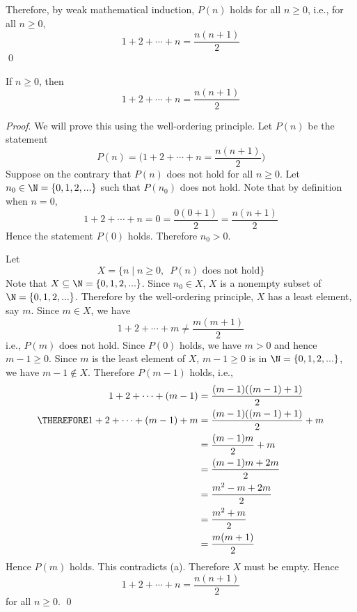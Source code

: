 Therefore, by weak mathematical induction,
$P(n)$ holds for all $n \geq 0$, i.e.,
for all $n \geq 0$,
\[
  1 + 2 + \cdots + n = \frac{n(n + 1)}{2}
\]
\qed




\newpage
\begin{thm}
  If $n \geq 0$, then
  \[
    1 + 2 + \cdots + n = \frac{n(n + 1)}{2}
  \]
\end{thm}

\textit{Proof}.
We will prove this using the well-ordering principle.
Let $P(n)$ be the statement
\[
    P(n) = \biggl( 1 + 2 + \cdots + n = \frac{n(n + 1)}{2} \biggr)
\]
Suppose on the contrary that $P(n)$ does not hold for all $n \geq 0$.
Let $n_0 \in \N = \{0, 1, 2, ...\}$ such that $P(n_0)$ does not hold.
Note that by definition when $n = 0$,
\[
1 + 2 + \cdots + n = 0 = \frac{0(0 + 1)}{2} = \frac{n(n + 1)}{2}
\]
Hence the statement $P(0)$ holds.
Therefore $n_0 > 0$.

Let
\[
X = \{n \mid n \geq 0, \,\,\, P(n) \text{ does not hold}\}
\]
Note that $X \subseteq \N = \{0, 1, 2, ...\}$.
Since $n_0 \in X$, $X$ is a nonempty subset of $\N = \{0, 1, 2, ...\}$.
Therefore by the well-ordering principle, $X$ has a least element, say $m$.
Since $m \in X$, we have 
\[
1 + 2 + \cdots + m \neq \frac{m(m + 1)}{2} \tag{a}
\]
i.e., $P(m)$ does not hold.
Since $P(0)$ holds, we have $m > 0$ and hence $m - 1 \geq 0$.
Since $m$ is the least element of $X$, $m - 1 \geq 0$ is in
$\N = \{0, 1, 2, ...\}$, we have $m - 1 \notin X$.
Therefore $P(m - 1)$ holds, i.e.,
\begin{align*}
             1 + 2 + \cdots + (m - 1)     &= \frac{(m - 1)((m - 1) + 1)}{2} \\
  \THEREFORE 1 + 2 + \cdots + (m - 1) + m &= \frac{(m - 1)((m - 1) + 1)}{2} + m \\
                                          &= \frac{(m - 1)m}{2} + m \\
                                          &= \frac{(m - 1)m + 2m}{2} \\
                                          &= \frac{m^2 - m + 2m}{2} \\
                                          &= \frac{m^2 + m}{2} \\
                                          &= \frac{m(m + 1)}{2} \\
\end{align*}
Hence $P(m)$ holds.
This contradicts (a).
Therefore $X$ must be empty.
Hence
\[
1 + 2 + \cdots + n = \frac{n(n + 1)}{2}
\]
for all $n \geq 0$.
\qed


